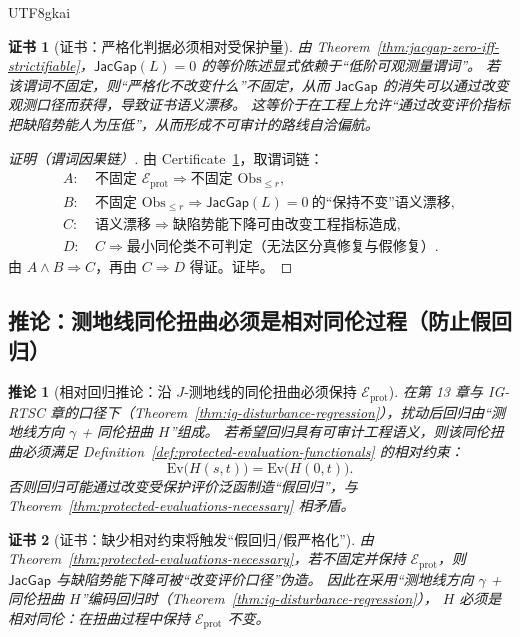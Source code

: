 \documentclass[12pt]{article}
\newtheorem{corollary}{推论}[section]
\newtheorem{certificate}{证书}[section]
\newcommand{\JacGap}{\ensuremath{\mathsf{JacGap}}}
\begin{document}
\begin{CJK*}{UTF8}{gkai}
\begin{certificate}[证书：严格化判据必须相对受保护量]
\label{cert:protected-evaluations-necessary}
由 Theorem~\ref{thm:jacgap-zero-iff-strictifiable}，$\JacGap(L)=0$ 的等价陈述显式依赖于“低阶可观测量谓词”。
若该谓词不固定，则“严格化不改变什么”不固定，从而 $\JacGap$ 的消失可以通过改变观测口径而获得，导致证书语义漂移。
这等价于在工程上允许“通过改变评价指标把缺陷势能人为压低”，从而形成不可审计的路线自洽偏航。
\end{certificate}

\begin{proof}[证明（谓词因果链）]
由 Certificate~\ref{cert:protected-evaluations-necessary}，取谓词链：
\[
\begin{aligned}
A:&\ \text{不固定 }\mathcal{E}_{\mathrm{prot}}\Rightarrow \text{不固定 }\mathrm{Obs}_{\le r},\\
B:&\ \text{不固定 }\mathrm{Obs}_{\le r}\Rightarrow \JacGap(L)=0\ \text{的“保持不变”语义漂移},\\
C:&\ \text{语义漂移}\Rightarrow \text{缺陷势能下降可由改变工程指标造成},\\
D:&\ C\Rightarrow \text{最小同伦类不可判定（无法区分真修复与假修复）}.
\end{aligned}
\]
由 $A\wedge B\Rightarrow C$，再由 $C\Rightarrow D$ 得证。证毕。
\end{proof}

\subsection{推论：测地线同伦扭曲必须是相对同伦过程（防止假回归）}

\begin{corollary}[相对回归推论：沿 $J$‑测地线的同伦扭曲必须保持 $\mathcal{E}_{\mathrm{prot}}$]
\label{cor:relative-geodesic-twist}
在第 13 章与 \textsf{IG-RTSC} 章的口径下（Theorem~\ref{thm:ig-disturbance-regression}），扰动后回归由“测地线方向 $\gamma$ + 同伦扭曲 $H$”组成。
若希望回归具有可审计工程语义，则该同伦扭曲必须满足 Definition~\ref{def:protected-evaluation-functionals} 的相对约束：
\[
\mathrm{Ev}\bigl(H(s,t)\bigr)=\mathrm{Ev}\bigl(H(0,t)\bigr).
\]
否则回归可能通过改变受保护评价泛函制造“假回归”，与 Theorem~\ref{thm:protected-evaluations-necessary} 相矛盾。
\end{corollary}

\begin{certificate}[证书：缺少相对约束将触发“假回归/假严格化”]
\label{cert:relative-geodesic-twist}
由 Theorem~\ref{thm:protected-evaluations-necessary}，若不固定并保持 $\mathcal{E}_{\mathrm{prot}}$，则 $\JacGap$
  与缺陷势能下降可被“改变评价口径”伪造。
因此在采用“测地线方向 $\gamma$ + 同伦扭曲 $H$”编码回归时（Theorem~\ref{thm:ig-disturbance-regression}），
$H$ 必须是相对同伦：在扭曲过程中保持 $\mathcal{E}_{\mathrm{prot}}$ 不变。
\end{certificate}


\end{CJK*}
\end{document}
